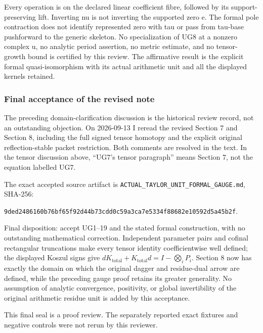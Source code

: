 Every operation is on the declared linear coefficient fibre, followed by its support-preserving lift. Inverting nu is not inverting the supported zero e. The formal pole contraction does not identify represented zero with tau or pass from tau-base pushforward to the generic skeleton. No specialization of UG8 at a nonzero complex u, no analytic period assertion, no metric estimate, and no tensor-growth bound is certified by this review. The affirmative result is the explicit formal quasi-isomorphism with its actual arithmetic unit and all the displayed kernels retained.

\subsubsection{Final acceptance of the revised note}\label{endpoint-f1_unit_gauge_review--final-acceptance-of-the-revised-note}

The preceding domain-clarification discussion is the historical review record, not an outstanding objection. On 2026-09-13 I reread the revised Section 7 and Section 8, including the full signed tensor homotopy and the explicit original reflection-stable packet restriction. Both comments are resolved in the text. In the tensor discussion above, ``UG7's tensor paragraph'' means Section 7, not the equation labelled UG7.

The exact accepted source artifact is \nolinkurl{ACTUAL_TAYLOR_UNIT_FORMAL_GAUGE.md}, SHA-256:

\nolinkurl{9ded2486160b76bf65f92d44b73cdd0c59a3ca7e5334f88682e10592d5a45b2f}.

Final disposition: accept UG1--19 and the stated formal construction, with no outstanding mathematical correction. Independent parameter pairs and cofinal rectangular truncations make every tensor identity coefficientwise well defined; the displayed Koszul signs give \(dK_{\mathrm{total}}+K_{\mathrm{total}}d=I-\bigotimes_i P_i\). Section 8 now has exactly the domain on which the original dagger and residue-dual arrow are defined, while the preceding gauge proof retains its greater generality. No assumption of analytic convergence, positivity, or global invertibility of the original arithmetic residue unit is added by this acceptance.

This final seal is a proof review. The separately reported exact fixtures and negative controls were not rerun by this reviewer.
